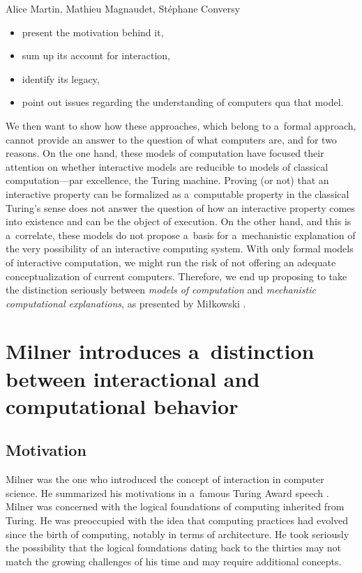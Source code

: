 \begin{artengenv2auth}{Alice Martin, Mathieu Magnaudet, Stéphane Conversy}
\begin{itemize}
    \item present the motivation behind it, 
    \item sum up its account for interaction,
    \item identify its legacy,
    \item point out issues regarding the understanding of computers qua that model.
\end{itemize}

We then want to show how these approaches, which belong to a~formal approach, cannot provide an answer to the question of what computers are, and for two reasons. On the one hand, these models of computation have focused their attention on whether interactive models are reducible to models of classical computation---par excellence, the Turing machine. Proving (or not) that an interactive property can be formalized as a~computable property in the classical Turing’s sense does not answer the question of how an interactive property comes into existence and can be the object of execution. On the other hand, and this is a~correlate, these models do not propose a~basis for a~mechanistic explanation of the very possibility of an interactive computing system. With only formal models of interactive computation, we might run the risk of not offering an adequate conceptualization of current computers. Therefore, we end up proposing to take the distinction seriously between \emph{models of computation} and \emph{mechanistic computational explanations}, as presented by Miłkowski \parencite*{Mikowski2011, Mikowski2014}.

\section{Milner introduces a~distinction between interactional and computational behavior}
\label{Milner}
\subsection{Motivation}

Milner was the one who introduced the concept of interaction in computer science. He summarized his motivations in a~famous Turing Award speech \parencite{Milner1993}. Milner was concerned with the logical foundations of computing inherited from Turing. He was preoccupied with the idea that computing practices had evolved since the birth of computing, notably in terms of architecture. He took seriously the possibility that the logical foundations dating back to the thirties may not match the growing challenges of his time and may require additional concepts.


\end{artengenv2auth}

